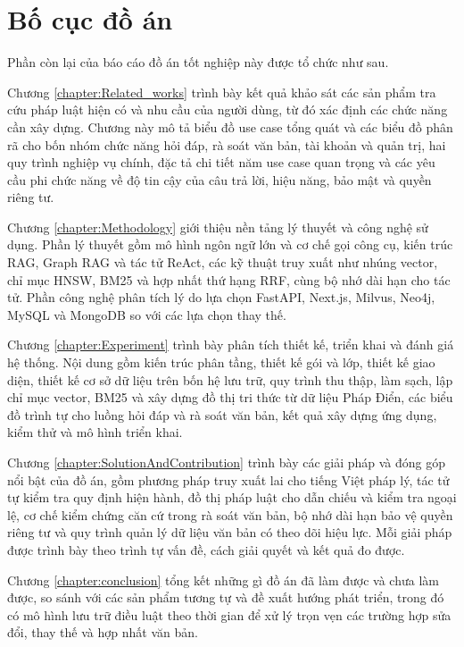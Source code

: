 \documentclass[../DoAn.tex]{subfiles}
\begin{document}
\section{Bố cục đồ án}
\label{section:1.4}
Phần còn lại của báo cáo đồ án tốt nghiệp này được tổ chức như sau.

Chương \ref{chapter:Related_works} trình bày kết quả khảo sát các sản phẩm tra cứu pháp luật hiện có và nhu cầu của người dùng, từ đó xác định các chức năng cần xây dựng. Chương này mô tả biểu đồ use case tổng quát và các biểu đồ phân rã cho bốn nhóm chức năng hỏi đáp, rà soát văn bản, tài khoản và quản trị, hai quy trình nghiệp vụ chính, đặc tả chi tiết năm use case quan trọng và các yêu cầu phi chức năng về độ tin cậy của câu trả lời, hiệu năng, bảo mật và quyền riêng tư.

Chương \ref{chapter:Methodology} giới thiệu nền tảng lý thuyết và công nghệ sử dụng. Phần lý thuyết gồm mô hình ngôn ngữ lớn và cơ chế gọi công cụ, kiến trúc RAG, Graph RAG và tác tử ReAct, các kỹ thuật truy xuất như nhúng vector, chỉ mục HNSW, BM25 và hợp nhất thứ hạng RRF, cùng bộ nhớ dài hạn cho tác tử. Phần công nghệ phân tích lý do lựa chọn FastAPI, Next.js, Milvus, Neo4j, MySQL và MongoDB so với các lựa chọn thay thế.

Chương \ref{chapter:Experiment} trình bày phân tích thiết kế, triển khai và đánh giá hệ thống. Nội dung gồm kiến trúc phân tầng, thiết kế gói và lớp, thiết kế giao diện, thiết kế cơ sở dữ liệu trên bốn hệ lưu trữ, quy trình thu thập, làm sạch, lập chỉ mục vector, BM25 và xây dựng đồ thị tri thức từ dữ liệu Pháp Điển, các biểu đồ trình tự cho luồng hỏi đáp và rà soát văn bản, kết quả xây dựng ứng dụng, kiểm thử và mô hình triển khai.

Chương \ref{chapter:SolutionAndContribution} trình bày các giải pháp và đóng góp nổi bật của đồ án, gồm phương pháp truy xuất lai cho tiếng Việt pháp lý, tác tử tự kiểm tra quy định hiện hành, đồ thị pháp luật cho dẫn chiếu và kiểm tra ngoại lệ, cơ chế kiểm chứng căn cứ trong rà soát văn bản, bộ nhớ dài hạn bảo vệ quyền riêng tư và quy trình quản lý dữ liệu văn bản có theo dõi hiệu lực. Mỗi giải pháp được trình bày theo trình tự vấn đề, cách giải quyết và kết quả đo được.

Chương \ref{chapter:conclusion} tổng kết những gì đồ án đã làm được và chưa làm được, so sánh với các sản phẩm tương tự và đề xuất hướng phát triển, trong đó có mô hình lưu trữ điều luật theo thời gian để xử lý trọn vẹn các trường hợp sửa đổi, thay thế và hợp nhất văn bản.
\end{document}
